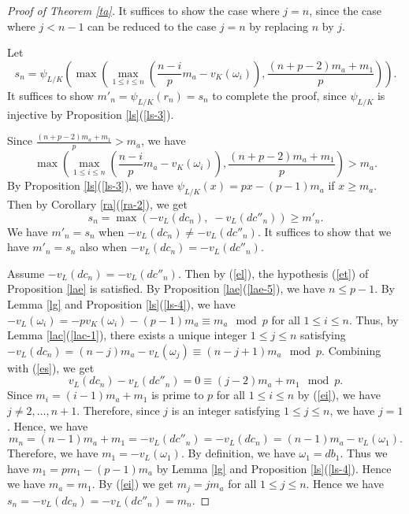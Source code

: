 \documentclass[10pt,a4paper]{amsart}
\numberwithin{equation}{section}
\theoremstyle{plain}
\theoremstyle{definition}
\begin{document}
\begin{proof}[Proof of Theorem \ref{ta}]
  It suffices to show the case where $j=n$, since the case where $j<n-1$ can be reduced to the case $j=n$ by replacing $n$ by $j$.
  
Let
\begin{equation}
  s_n=\psi_{L/K}\left(\max\left(\max_{1\leq i\leq n}\left(\frac{n-i}{p}m_a-v_K\left(\omega_i\right)\right),\frac{(n+p-2)m_a+m_1}{p}\right)\right).
\end{equation}
It suffices to show $m'_n=\psi_{L/K}(r_n)=s_n$ to complete the proof, since $\psi_{L/K}$ is injective by Proposition \ref{ls}(\ref{ls-3}).

Since $\displaystyle{\frac{(n+p-2)m_a+m_1}{p}>m_a}$, we have
\begin{equation}
\max\left(\max_{1\leq i\leq n}\left(\frac{n-i}{p}m_a-v_K\left(\omega_i\right)\right),\frac{(n+p-2)m_a+m_1}{p}\right)>m_a.
\end{equation}
By Proposition \ref{ls}(\ref{ls-3}), we have $\psi_{L/K}(x)=px-(p-1)m_a$ if $x\geq m_a$. Then by Corollary \ref{ra}(\ref{ra-2}), we get
\begin{equation}
s_n=\max(-v_L(dc_n),\;-v_L(dc''_n))\geq m'_n.
\end{equation}
We have $m'_n=s_n$ when $-v_L(dc_n)\neq -v_L(dc''_n)$. It suffices to show that we have $m'_n=s_n$ also when $-v_L(dc_n)=-v_L(dc''_n)$.

Assume $-v_L(dc_n)=-v_L(dc''_n)$. Then by (\ref{el}), the hypothesis (\ref{et}) of Proposition \ref{lae} is satisfied. By Proposition \ref{lae}(\ref{lae-5}), we have $n\leq p-1$. By Lemma \ref{lg} and Proposition \ref{ls}(\ref{ls-4}), we have $-v_L(\omega_i)=-pv_K(\omega_i)-(p-1)m_a\equiv m_a\mod p$ for all $1\leq i\leq n$. Thus, by Lemma \ref{lac}(\ref{lac-1}), there exists a unique integer $1\leq j\leq n$ satisfying $-v_L(dc_n)=(n-j)m_a-v_L(\omega_j)\equiv (n-j+1)m_a\mod p$. Combining with (\ref{es}), we get
\begin{equation}
v_L(dc_n)-v_L(dc''_n)=0\equiv (j-2)m_a+m_1\mod p.
\end{equation}
Since $m_i=(i-1)m_a+m_1$ is prime to $p$ for all $1\leq i\leq n$ by (\ref{ei}), we have $j\neq 2,\ldots,n+1$. Therefore, since $j$ is an integer satisfying $1\leq j\leq n$, we have $j=1$. Hence, we have
\begin{equation}\label{ew}
m_n=(n-1)m_a+m_1=-v_L(dc''_n)=-v_L(dc_n)=(n-1)m_a-v_L(\omega_1).
\end{equation}
Therefore, we have $m_1=-v_L(\omega_1)$. By definition, we have $\omega_1=db_1$. Thus we have $m_1=pm_1-(p-1)m_a$ by Lemma \ref{lg} and Proposition \ref{ls}(\ref{ls-4}). Hence we have $m_a=m_1$. By (\ref{ei}) we get $m_j=jm_a$ for all $1\leq j\leq n$. Hence we have $s_n=-v_L(dc_n)=-v_L(dc''_n)=m_n$.


\end{proof}
\end{document}
